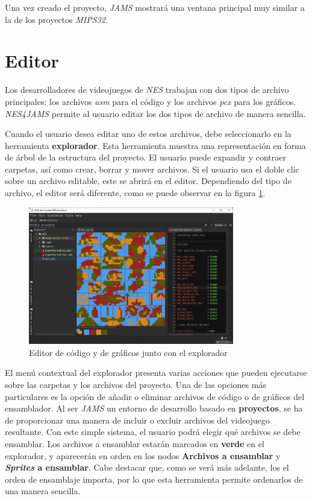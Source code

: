 Una vez creado el proyecto, \textit{JAMS} mostrará una ventana
principal muy similar a la de los proyectos \textit{MIPS32}.

\section{Editor}\label{sec:editor}

Los desarrolladores de videojuegos de \textit{NES} trabajan con
dos tipos de archivo principales: los archivos \textit{asm}
para el código y los archivos \textit{pcx} para los gráficos.
\textit{NES4JAMS} permite al usuario editar los dos tipos de archivo
de manera sencilla.

Cuando el usuario desea editar uno de estos archivos,
debe seleccionarlo en la herramienta \textbf{explorador}.
Esta herramienta muestra una representación en forma de árbol
de la estructura del proyecto.
El usuario puede expandir y contraer carpetas, así como crear,
borrar y mover archivos.
Si el usuario usa el doble clic sobre un archivo editable, este se abrirá
en el editor.
Dependiendo del tipo de archivo, el editor será diferente,
como se puede observar en la figura \ref{fig:jams-nes-editor}.

\begin{figure}[h]
    \centering
    \includegraphics[width=0.8\textwidth]{images/nes/nes-editor}
    \caption{Editor de código y de gráficos junto con el explorador}
    \label{fig:jams-nes-editor}
\end{figure}

El menú contextual del explorador presenta varias acciones que
pueden ejecutarse sobre las carpetas y los archivos
del proyecto.
Una de las opciones más particulares es la opción de añadir o eliminar
archivos de código o de gráficos del ensamblador.
Al ser \textit{JAMS} un entorno de desarrollo basado en \textbf{proyectos},
se ha de proporcionar una manera de incluir o excluir archivos del
videojuego resultante.
Con este simple sistema, el usuario podrá elegir qué archivos se debe ensamblar.
Los archivos a ensamblar estarán marcados en \textbf{verde} en el explorador,
y aparecerán en orden en los nodos \textbf{Archivos a ensamblar} y
\textbf{\textit{Sprites} a ensamblar}.
Cabe destacar que, como se verá más adelante, los el orden de ensamblaje
importa, por lo que esta herramienta permite ordenarlos de una manera sencilla.

